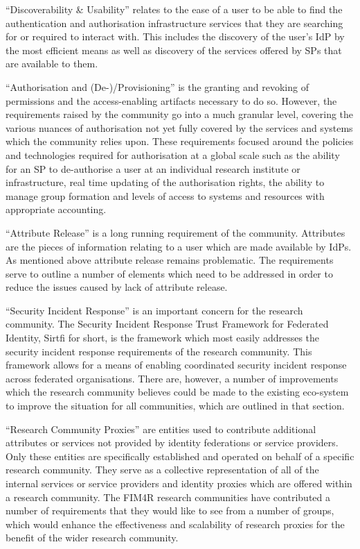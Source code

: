 \documentclass[fleqn,11pt]{wlscirep}
\begin{document}
{“Discoverability \& Usability” relates to the ease of a user to be able to find the authentication and authorisation infrastructure services that they are searching for or required to interact with.  This includes the discovery of the user’s IdP by the most efficient means as well as discovery of the services offered by SPs that are available to them. 

“Authorisation and (De-)/Provisioning” is the granting and revoking of permissions and the access-enabling artifacts necessary to do so.  However, the requirements raised by the community go into a much granular level, covering the various nuances of authorisation not yet fully covered by the services and systems which the community relies upon.  These requirements focused around the policies and technologies required for authorisation at a global scale such as the ability for an SP to de-authorise a user at an individual research institute or infrastructure, real time updating of the authorisation rights, the ability to manage group formation and levels of access to systems and resources with appropriate accounting.     

“Attribute Release” is a long running requirement of the community.  Attributes are the pieces of information relating to a user which are made available by IdPs.  As mentioned above attribute release remains problematic. The requirements serve to outline a number of elements which need to be addressed in order to reduce the issues caused by lack of attribute release.  

“Security Incident Response” is an important concern for the research community.  The Security Incident Response Trust Framework for Federated Identity, Sirtfi for short, is the framework which most easily addresses the security incident response requirements of the research community.  This framework allows for a means of enabling coordinated security incident response across federated organisations. There are, however, a number of improvements which the research community believes could be made to the existing eco-system to improve the situation for all communities, which are outlined in that section.

“Research Community Proxies” are entities used to contribute additional attributes or services not provided by identity federations or service providers.  Only these entities are specifically established and operated on behalf of a specific research community.  They serve as a collective representation of all of the internal services or service providers and identity proxies which are offered within a research community. The FIM4R research communities have contributed a number of requirements that they would like to see from a number of groups, which would enhance the effectiveness and scalability of research proxies for the benefit of the wider research community. 

}
\end{document}
